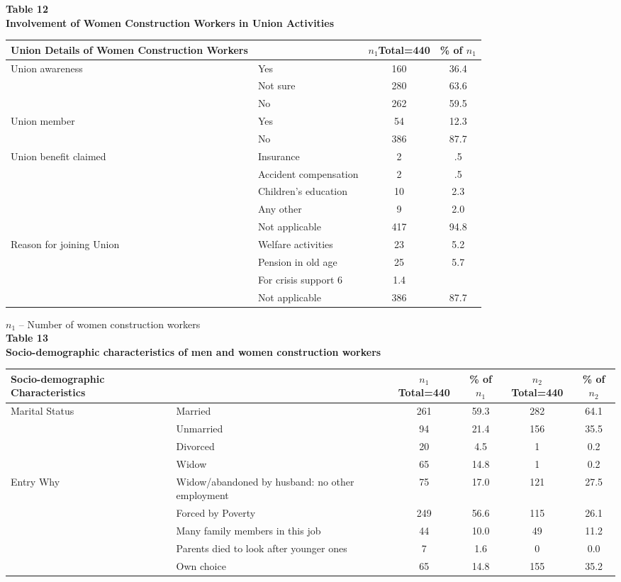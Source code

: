 \documentclass[12pt]{report}
\newcommand{\bt}[1]{\textbf{#1}}
\newcommand{\NI}{\noindent}
\begin{document}
	\NI\bt{Table 12}\\
	\bt{Involvement of Women Construction Workers in Union Activities}
	\begin{longtable}{p{}@{\hskip 0.1in}l@{\hskip 0.1in}c@{\hskip 0.1in}c@{\hskip 0.1in}}
		\hline
		\bt{Union Details of Women Construction Workers} & & $n_1${\footnotesize Total=440} & {\footnotesize\% of }$n_1$\\ \hline
		\multirow{3}{=}{Union awareness} & Yes & 160 & 36.4 \\
		& Not sure & 280 & 63.6\\
		& No & 262 & 59.5 \\ \hline
		\multirow{2}{=}{Union member} & Yes & 54 & 12.3 \\
		& No & 386 & 87.7 \\ \hline
		\multirow{5}{=}{Union benefit claimed} & Insurance & 2 & .5 \\
		& Accident compensation & 2 & .5 \\
		& Children’s education & 10 & 2.3 \\
		& Any other & 9 & 2.0 \\
		& Not applicable & 417 & 94.8\\ \hline
		\multirow{4}{=}{Reason for joining Union} & Welfare activities & 23 & 5.2 \\
		& Pension in old age & 25 & 5.7 \\
		& For crisis support 6 & 1.4 \\
		& Not applicable & 386 & 87.7\\ \hline
	\end{longtable}
	$n_1$ – Number of women construction workers\\
	\newpage
	\NI\bt{Table 13}\\
	\bt{Socio-demographic characteristics of men and women construction workers}
	\begin{longtable}{p{}p{}@{\hskip 0.05in}c@{\hskip 0.07in}c@{\hskip 0.08in}c@{\hskip 0.07in}c}
		\hline
		\bt{Socio-demographic Characteristics}& &$n_1${\footnotesize Total=440} & {\footnotesize\% of }$n_1$   &    $n_2${\footnotesize Total=440}  & {\footnotesize\% of }$n_2$  \\ \hline
		\multirow{4}{=}{Marital Status}  & Married & 261 & 59.3 & 282 & 64.1 \\
		& Unmarried & 94 & 21.4 & 156 &35.5\\
		& Divorced & 20 & 4.5 & 1 & 0.2\\
		& Widow & 65 & 14.8 & 1 & 0.2 \\ \hline 
		\multirow{5}{=}{Entry Why}  & Widow/abandoned by husband: no other employment & 75 & 17.0  & 121 & 27.5 \\
		& Forced by Poverty & 249 & 56.6 & 115 & 26.1 \\
		& Many family members in this job & 44 & 10.0  & 49 & 11.2 \\
		& Parents died to look after younger ones & 7 &1.6 & 0 & 0.0 \\ 
		& Own choice & 65 & 14.8 & 155 & 35.2 \\ \hline 
	\end{longtable}
\end{document}
